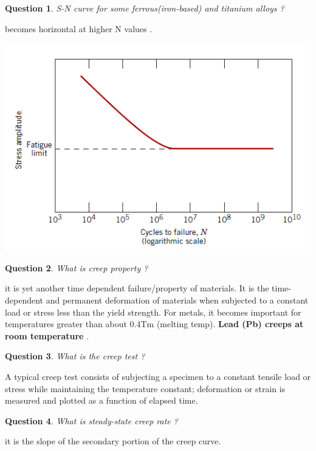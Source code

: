 \documentclass[13]{article}
\newtheorem{exer}{Question}
\begin{document}
\begin{exer}
	S-N curve for some ferrous(iron-based) and titanium alloys ?
\end{exer}
becomes horizontal at higher N values . 	
\begin{center}
\includegraphics[scale=0.5]{figures/38.png}
\end{center}
\begin{exer}
What is creep property ?
\end{exer}
it is yet another time dependent failure/property of materials. It is the time-dependent and permanent deformation of materials when subjected to a constant load or stress less than the yield strength. For metals, it becomes important for temperatures greater than about 0.4Tm (melting temp). \textbf{Lead (Pb) creeps at room temperature} .
\begin{exer}
What is the creep test ?
\end{exer}
A typical creep test consists of subjecting a specimen to a constant tensile
load or stress while maintaining the temperature constant; deformation or
strain is measured and plotted as a function of elapsed time.
\begin{exer}
What is steady-state creep rate ?	
\end{exer}
it is the slope of the secondary portion of the creep curve. 
\end{document}
